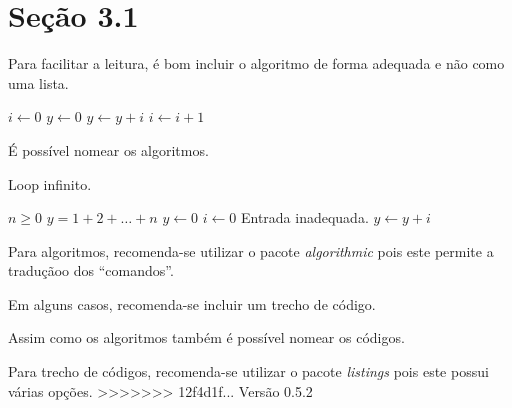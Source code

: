 \section{Seção 3.1}
Para facilitar a leitura, é bom incluir o algoritmo de forma adequada e não
como uma lista.
\begin{algorithmic}[2]
  \STATE $i \leftarrow 0$
  \STATE $y \leftarrow 0$
    \STATE $y \leftarrow y + i$
    \STATE $i \leftarrow i + 1$
  \ENDFOR
\end{algorithmic}

É possível nomear os algoritmos.
\begin{algorithm}
  \caption{Loop infinito.}
  \label{alg:loop_inf}
  \begin{algorithmic}
    \REQUIRE $n \geq 0$
    \ENSURE $y = 1 + 2 + \ldots + n$
    \STATE $y \leftarrow 0$
    \STATE $i \leftarrow 0$
      \PRINT Entrada inadequada.
    \ELSE
        \STATE $y \leftarrow y + i$
      \ENDWHILE
    \ENDIF
  \end{algorithmic}
\end{algorithm}

Para algoritmos, recomenda-se utilizar o pacote
\emph{algorithmic} pois este
permite a traduçãoo dos ``comandos''.

Em alguns casos, recomenda-se incluir um trecho de
código.


Assim como os algoritmos também é possível nomear os códigos.


Para trecho de códigos,  recomenda-se utilizar o pacote
\emph{listings} pois
este possui várias opções.
>>>>>>> 12f4d1f... Versão 0.5.2
